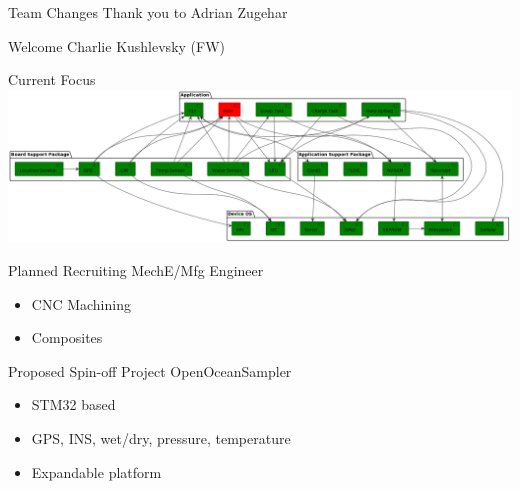 \begin{frame}{Team Changes}
    Thank you to Adrian Zugehar

    Welcome Charlie Kushlevsky (FW)
\end{frame}
\begin{frame}{Current Focus}
    \centering
    \includegraphics[height=0.7\textheight,width=\textwidth,keepaspectratio]{images/sf_service_diag.png}
\end{frame}
\begin{frame}{Planned Recruiting}
    MechE/Mfg Engineer
    \begin{itemize}
        \item CNC Machining
        \item Composites
    \end{itemize}
\end{frame}
\begin{frame}{Proposed Spin-off Project}
    OpenOceanSampler
    \begin{itemize}
        \item STM32 based
        \item GPS, INS, wet/dry, pressure, temperature
        \item Expandable platform
    \end{itemize}
\end{frame}



